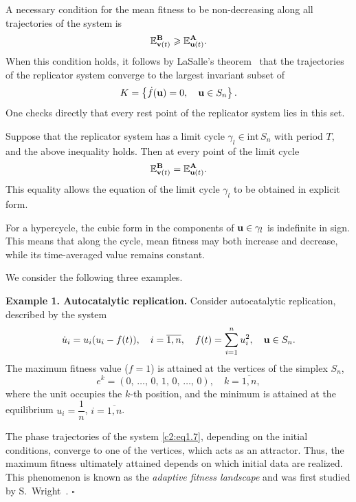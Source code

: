 \documentclass[12pt]{report}
\newcommand{\inside}{\mathrm{int}\,}
\theoremstyle{definition}
\theoremstyle{remark}
\begin{document}
A necessary condition for the mean fitness to be non-decreasing along all trajectories of the system is
\begin{equation*}
	\mathbb{E}_{{\bf v}(t)}^{\bf B} \geqslant \mathbb{E}_{{\bf u}(t)}^{\bf A}.
\end{equation*}
When this condition holds, it follows by LaSalle's theorem~\cite{c2:LaSalle1961,c2:Bratus2010} that the trajectories of the replicator system converge to the largest invariant subset of
\begin{equation*}
	K = \left\{\dot{f}({\bf u}) = 0, \quad {\bf u} \in S_n \right\}.
\end{equation*}
One checks directly that every rest point of the replicator system lies in this set.

Suppose that the replicator system has a limit cycle $\gamma_l \in \inside S_n$ with period $T$, and the above inequality holds. Then at every point of the limit cycle
\begin{equation*}
	\mathbb{E}_{{\bf v}(t)}^{\bf B} = \mathbb{E}_{{\bf u}(t)}^{\bf A}.
\end{equation*}
This equality allows the equation of the limit cycle $\gamma_l$ to be obtained in explicit form.

For a hypercycle, the cubic form in the components of ${\bf u} \in \gamma_l$ is indefinite in sign. This means that along the cycle, mean fitness may both increase and decrease, while its time-averaged value remains constant.

We consider the following three examples.

\medskip
\textbf{Example 1. Autocatalytic replication.}
Consider autocatalytic replication, described by the system
\begin{equation}  
\dot{u}_{i} = u_{i}(u_{i} - f(t)), \quad i = \overline{1, n}, \quad f(t) = \sum\limits_{i = 1}^{n}u_{i}^{2}, \quad {\bf u} \in S_{n}.
\label{c2:eq1.7}
\end{equation}
The maximum fitness value ($f = 1$) is attained at the vertices of the simplex $S_{n}$,
$$
e^{k} = (0,\, \ldots,\, 0,\, 1,\, 0,\, \ldots,\, 0), \quad k = \overline{1, n},
$$ 
where the unit occupies the $k$-th position, and the minimum is attained at the equilibrium $u_{i} = \dfrac{1}{n}$, $i = \overline{1, n}$.

The phase trajectories of the system \eqref{c2:eq1.7}, depending on the initial conditions, converge to one of the vertices, which acts as an attractor. Thus, the maximum fitness ultimately attained depends on which initial data are realized. This phenomenon is known as the \textit{adaptive fitness landscape} and was first studied by S.~Wright~\cite{c2:Maynard1982,c2:Wright1932}.
\hfill$\square$
\end{document}
